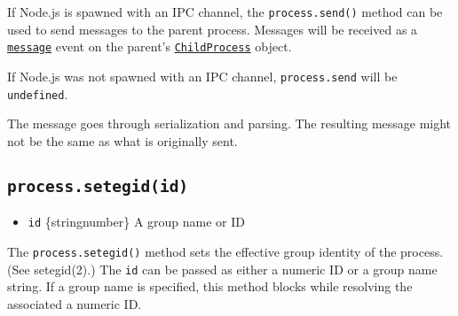 If Node.js is spawned with an IPC channel, the \texttt{process.send()}
method can be used to send messages to the parent process. Messages will
be received as a
\href{child_process.md\#event-message}{\texttt{\textquotesingle{}message\textquotesingle{}}}
event on the parent's
\href{child_process.md\#class-childprocess}{\texttt{ChildProcess}}
object.

If Node.js was not spawned with an IPC channel, \texttt{process.send}
will be \texttt{undefined}.

The message goes through serialization and parsing. The resulting
message might not be the same as what is originally sent.

\subsection{\texorpdfstring{\texttt{process.setegid(id)}}{process.setegid(id)}}\label{process.setegidid}

\begin{itemize}
\tightlist
\item
  \texttt{id} \{string\textbar number\} A group name or ID
\end{itemize}

The \texttt{process.setegid()} method sets the effective group identity
of the process. (See setegid(2).) The \texttt{id} can be passed as
either a numeric ID or a group name string. If a group name is
specified, this method blocks while resolving the associated a numeric
ID.

\begin{Shaded}
\begin{Highlighting}[]
   \OperatorTok{;}

\NormalTok{ (} \OperatorTok{\&\&} \NormalTok{) \{}
  \NormalTok{(}\SpecialCharTok{$\{}\NormalTok{()}\SpecialCharTok{\}}\VerbatimStringTok{\textasciigrave{}}\NormalTok{)}\OperatorTok{;}
  \NormalTok{ \{}
    \NormalTok{(}\NormalTok{)}\OperatorTok{;}
    \NormalTok{(}\SpecialCharTok{$\{}\NormalTok{()}\SpecialCharTok{\}}\VerbatimStringTok{\textasciigrave{}}\NormalTok{)}\OperatorTok{;}
\NormalTok{  \} }
    \NormalTok{(}\SpecialCharTok{$\{}\SpecialCharTok{\}}\VerbatimStringTok{\textasciigrave{}}\NormalTok{)}\OperatorTok{;}
\NormalTok{  \}}
\NormalTok{\}}
\end{Highlighting}
\end{Shaded}

